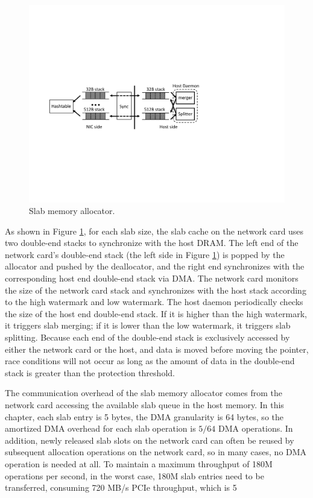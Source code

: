 \begin{figure}[htbp]
	\centering
	\includegraphics[width=.8\textwidth,page=1]{figure/cropped_slab.pdf}
	\caption{Slab memory allocator.}
	\label{kvdirect:fig:slab}
\end{figure}

As shown in Figure \ref {kvdirect:fig:slab}, for each slab size, the slab cache on the network card uses two double-end stacks to synchronize with the host DRAM. The left end of the network card's double-end stack (the left side in Figure \ref {kvdirect:fig:slab}) is popped by the allocator and pushed by the deallocator, and the right end synchronizes with the corresponding host end double-end stack via DMA. The network card monitors the size of the network card stack and synchronizes with the host stack according to the high watermark and low watermark. The host daemon periodically checks the size of the host end double-end stack. If it is higher than the high watermark, it triggers slab merging; if it is lower than the low watermark, it triggers slab splitting. Because each end of the double-end stack is exclusively accessed by either the network card or the host, and data is moved before moving the pointer, race conditions will not occur as long as the amount of data in the double-end stack is greater than the protection threshold.

\label{kvdirect:sec:slab-eval}

The communication overhead of the slab memory allocator comes from the network card accessing the available slab queue in the host memory. In this chapter, each slab entry is 5 bytes, the DMA granularity is 64 bytes, so the amortized DMA overhead for each slab operation is $5/64$ DMA operations. In addition, newly released slab slots on the network card can often be reused by subsequent allocation operations on the network card, so in many cases, no DMA operation is needed at all. To maintain a maximum throughput of 180M operations per second, in the worst case, 180M slab entries need to be transferred, consuming 720 MB/s PCIe throughput, which is 5%

